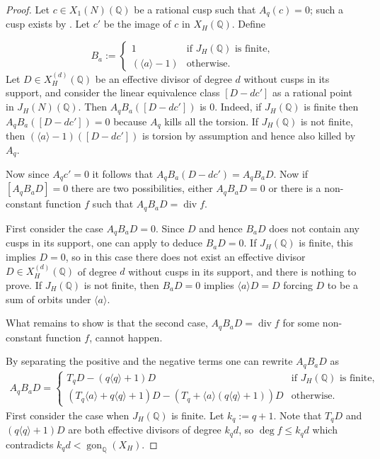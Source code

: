 \documentclass[11pt,reqno]{amsart}
\DeclareMathOperator{\ddiv}{div}
\DeclareMathOperator{\gon}{gon}
\theoremstyle{definition}
\numberwithin{equation}{section}
\newcommand{\Q}{\mathbb{Q}}
\newcommand{\diamondop}[1]{\langle #1 \rangle} %
\begin{document}
\begin{proof}
Let $c \in X_1(N)(\Q)$ be a rational cusp such that $A_q(c) = 0$; such a cusp exists by .  Let $c'$ be the image of $c$ in $X_H(\Q)$. Define 

\[ B_{a} :=\begin{cases}
           1 & \text{if $J_H(\Q)$ is finite, } \\
           (\diamondop{a}-1) & \text{otherwise.}
         \end{cases}
         \]
Let $D \in X_H^{(d)}(\Q)$ be an effective divisor of degree $d$ without cusps in its support, and consider the linear equivalence class $[D-dc']$ as a rational point in $J_H(N)(\Q)$. Then $A_qB_{a}([D-dc'])$ is $0$. Indeed, if $J_H(\Q)$ is finite then $A_qB_{a}([D-dc'])=0$ because $A_q$ kills all the torsion. If $J_H(\Q)$ is not finite, then $(\diamondop{a}-1)([D-dc'])$ is torsion by assumption and hence also killed by $A_q$.

Now since $A_qc' =0$ it follows that $A_qB_{a}(D-dc')=A_qB_{a}D$.
Now if $[A_qB_{a}D]=0$ there are two possibilities, either $A_qB_{a}D=0$ or there is a non-constant function $f$ such that $A_qB_{a}D = \ddiv f$.

First consider the case $A_qB_{a}D=0$. Since $D$ and hence $B_{a}D$ does not contain any cusps in its support, one can apply  to deduce $B_{a}D=0$. If $J_H(\Q)$ is finite, this implies $D=0$, so in this case there does not exist an effective divisor $D \in X_H^{(d)}(\Q)$ of degree $d$ without cusps in its support, and there is nothing to prove. If $J_H(\Q)$ is not finite, then $B_{a}D=0$ implies $\diamondop a D =D$ forcing $D$ to be a sum of orbits under $\diamondop a$.

What remains to show is that the second case, $A_qB_{a}D = \ddiv f$ for some non-constant function $f$, cannot happen.

By separating the positive and the negative terms one can rewrite $A_qB_{a}D$ as \begin{align}A_qB_{a}D=\begin{cases}
           T_qD - (q\diamondop{q}+1)D  & \text{if $J_H(\Q)$ is finite, } \\
           (T_q\diamondop{a}+q\diamondop{q}+1)D - (T_q +\diamondop{a}(q\diamondop{q}+1))D & \text{otherwise}. 
         \end{cases}\label{eq:linear-equivalence}\end{align}
First consider the case when $J_H(\Q)$ is finite. Let $k_q:=q+1$. Note that $T_qD$  and $(q\diamondop{q}+1)D$ are both effective divisors of degree $k_qd$, so $\deg f \leq k_qd$ which contradicts $k_qd < \gon_\Q(X_H).$


\end{proof}
\end{document}
